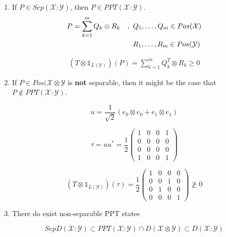 \documentclass{article}
\begin{document}
\begin{enumerate}
    \item If $P \in Sep(\mathcal{X}:\mathcal{Y})$, then $P \in
        PPT(\mathcal{X}:\mathcal{Y})$. 
        \begin{align*}
            P = \sum_{k=1}^m Q_k \otimes R_k \quad,\enskip &Q_1,\ldots,Q_m \in
            Pos(\mathcal{X}) \\
            & R_1, \ldots, R_m \in Pos(\mathcal{Y})
        \end{align*}
        
        \begin{align*}
            \left( T \otimes \mathds{1}_{L \left( \mathcal{Y} \right)}  \right)
            \left( P \right) = \sum_{k=1}^m Q_k^T \otimes R_k \ge 0
        \end{align*}
        
    \item If $P \in Pos(\mathcal{X}\otimes \mathcal{Y}$ is \textbf{not}
        separable, then it might be the case that $P \notin
        PPT(\mathcal{X}:\mathcal{Y})$.

        \[ 
            u = \frac{1}{\sqrt{2}} \left( e_0 \otimes e_0 + e_1 \otimes e_1 \right)
        \]

        \[ 
            \tau = u u^* = \frac{1}{2} \begin{pmatrix}
                1 & 0 & 0 & 1 \\ 0 & 0 & 0 & 0 \\
                0 & 0 & 0 & 0 \\ 1 & 0 & 0 & 1 
            \end{pmatrix} 
        \]
        
        \[ 
            \left( T \otimes \mathds{1}_{L \left( \mathcal{Y} \right)} \right)
            \left( \tau \right) = \frac{1}{2} \begin{pmatrix}
                1 & 0 & 0 & 0 \\ 0 & 0 & 1 & 0 \\
                0 & 1 & 0 & 0 \\ 0 & 0 & 0 & 1 
            \end{pmatrix} \ngeq 0
        \]
        
    \item   There do exist non-separable PPT states
        
        \[ 
            SepD(\mathcal{X}:\mathcal{Y}) \subset PPT(\mathcal{X}:\mathcal{Y})
            \cap D(\mathcal{X}\otimes \mathcal{Y}) \subset
            D(\mathcal{X}:\mathcal{Y})
        \]
\end{enumerate}
\end{document}
